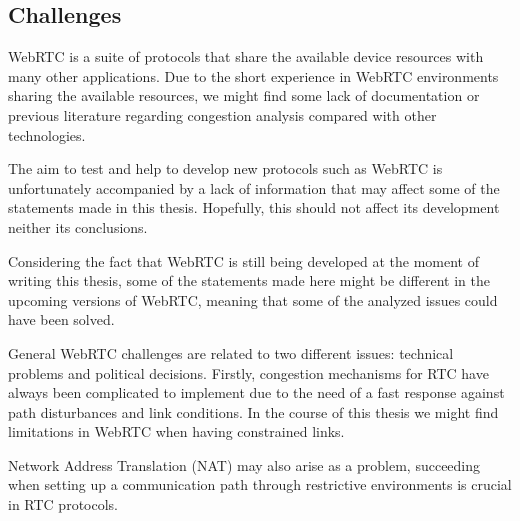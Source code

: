 

\subsection{Challenges}

WebRTC is a suite of protocols that share the available device resources with many other applications. Due to the short experience in WebRTC environments sharing the available resources, we might find some lack of documentation or previous literature regarding congestion analysis compared with other technologies. 

The aim to test and help to develop new protocols such as WebRTC is unfortunately accompanied by a lack of information that may affect some of the statements made in this thesis. Hopefully, this should not affect its development neither its conclusions.

Considering the fact that WebRTC is still being developed at the moment of writing this thesis, some of the statements made here might be different in the upcoming versions of WebRTC, meaning that some of the analyzed issues could have been solved.

General WebRTC challenges are related to two different issues: technical problems and political decisions. Firstly, congestion mechanisms for RTC have always been  complicated to implement due to the need of a fast response against path disturbances and link conditions. In the course of this thesis we might find limitations in WebRTC when having constrained links.

Network Address Translation (NAT)  may also arise as a problem, succeeding when setting up a communication path through restrictive environments is crucial in RTC protocols.


